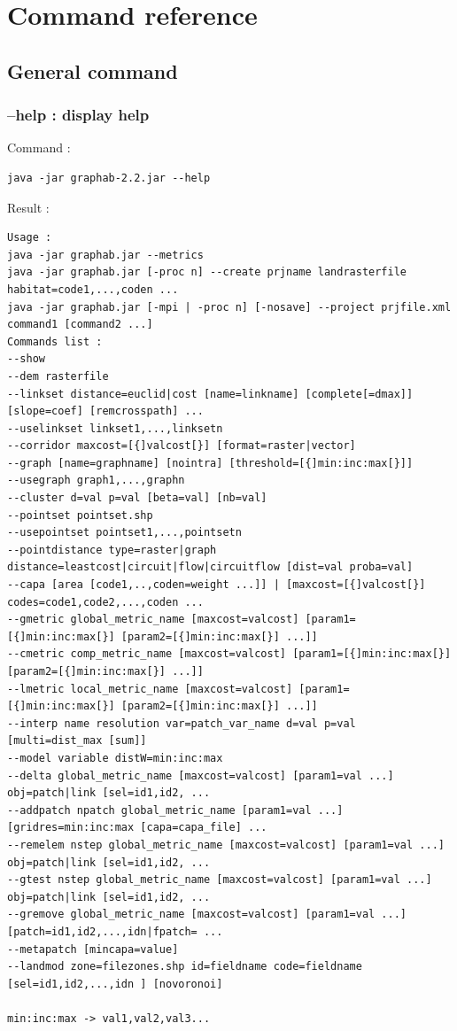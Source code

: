 \documentclass[a4paper,10pt]{report}
\begin{document}
\chapter{Command reference}
\section{General command}
\subsection{--help : display help}
Command :
\begin{Verbatim}
java -jar graphab-2.2.jar --help
\end{Verbatim}
Result :
\begin{verbatim}
Usage :
java -jar graphab.jar --metrics
java -jar graphab.jar [-proc n] --create prjname landrasterfile habitat=code1,...,coden ...
java -jar graphab.jar [-mpi | -proc n] [-nosave] --project prjfile.xml command1 [command2 ...]
Commands list :
--show
--dem rasterfile
--linkset distance=euclid|cost [name=linkname] [complete[=dmax]] [slope=coef] [remcrosspath] ...
--uselinkset linkset1,...,linksetn
--corridor maxcost=[{]valcost[}] [format=raster|vector]
--graph [name=graphname] [nointra] [threshold=[{]min:inc:max[}]]
--usegraph graph1,...,graphn
--cluster d=val p=val [beta=val] [nb=val]
--pointset pointset.shp
--usepointset pointset1,...,pointsetn
--pointdistance type=raster|graph distance=leastcost|circuit|flow|circuitflow [dist=val proba=val]
--capa [area [code1,..,coden=weight ...]] | [maxcost=[{]valcost[}] codes=code1,code2,...,coden ...
--gmetric global_metric_name [maxcost=valcost] [param1=[{]min:inc:max[}] [param2=[{]min:inc:max[}] ...]]
--cmetric comp_metric_name [maxcost=valcost] [param1=[{]min:inc:max[}] [param2=[{]min:inc:max[}] ...]]
--lmetric local_metric_name [maxcost=valcost] [param1=[{]min:inc:max[}] [param2=[{]min:inc:max[}] ...]]
--interp name resolution var=patch_var_name d=val p=val [multi=dist_max [sum]]
--model variable distW=min:inc:max
--delta global_metric_name [maxcost=valcost] [param1=val ...] obj=patch|link [sel=id1,id2, ...
--addpatch npatch global_metric_name [param1=val ...] [gridres=min:inc:max [capa=capa_file] ...
--remelem nstep global_metric_name [maxcost=valcost] [param1=val ...] obj=patch|link [sel=id1,id2, ...
--gtest nstep global_metric_name [maxcost=valcost] [param1=val ...] obj=patch|link [sel=id1,id2, ...
--gremove global_metric_name [maxcost=valcost] [param1=val ...] [patch=id1,id2,...,idn|fpatch= ...
--metapatch [mincapa=value]
--landmod zone=filezones.shp id=fieldname code=fieldname [sel=id1,id2,...,idn ] [novoronoi]

min:inc:max -> val1,val2,val3...
\end{verbatim}
\end{document}
